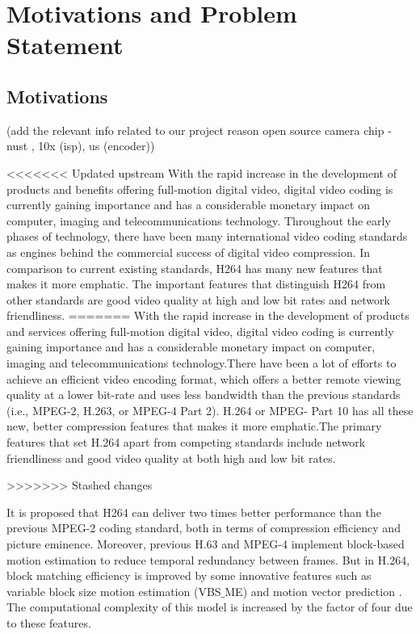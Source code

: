 
\chapter{Motivations and Problem Statement} %
\label{Chapter2}

\section{Motivations}

(add the relevant info related to our project reason open source camera chip - nust , 10x (isp), us (encoder))

<<<<<<< Updated upstream
With the rapid increase in the development of products and benefits offering full-motion digital video, digital video coding is currently gaining importance and has a considerable monetary impact on computer, imaging and telecommunications technology. Throughout the early phases of technology, there have been many international video coding standards as engines behind the commercial success of digital video compression. In comparison to current existing standards, H264 has many new features that makes it more emphatic. The important features that distinguish H264 from other standards are good video quality at high and low bit rates and network friendliness. \cite{amer2005high} 
=======
With the rapid increase in the development of products and services offering full-motion digital video, digital video coding is currently gaining importance and has a considerable monetary impact on computer, imaging and telecommunications technology.There have been a lot of efforts to achieve an efficient video encoding format, which offers a better remote viewing quality at a lower bit-rate and uses less bandwidth than the previous standards (i.e., MPEG-2, H.263, or MPEG-4 Part 2). H.264 or MPEG- Part 10 has all these new, better compression features that makes it more emphatic.The primary features that set H.264 apart from competing standards include network friendliness and good video quality at both high and low bit rates.

>>>>>>> Stashed changes

It is proposed that H264 can deliver two times better performance than the previous MPEG-2 coding standard, both in terms of compression efficiency and picture eminence. Moreover, previous H.63 and MPEG-4 implement block-based motion estimation to reduce temporal redundancy between frames. But in H.264, block matching efficiency is improved by some innovative features such as variable block size motion estimation (VBS$\_$ME) and motion vector prediction \cite{li2003serial}. The computational complexity of this model is increased by the factor of four due to these features.


